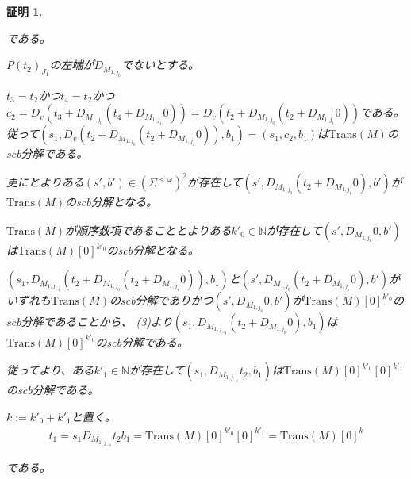 \documentclass[dvipdfmx,uplatex]{jsarticle}
\theoremstyle{customnonumberbreakfortheorem}
\theoremstyle{customnonumberbreakforproof}
\newtheorem{hideableproof}{証明}
\begin{document}
\begin{hideableproof}
\begin{indented}
\begin{indented}
\begin{indented}
\begin{indented}
\begin{indented}
						\item である。
					\end{indented}
					\item \(P(t_2)_{J_1}\)の左端が\(D_{M_{1,j_0}}\)でないとする。
					\begin{indented}
						\item \(t_3 = t_2\)かつ\(t_4 = t_2\)かつ\(c_2 = D_v(t_3 + D_{M_{1,j_0}}(t_4 + D_{M_{1,j_1}} 0)) = D_v(t_2 + D_{M_{1,j_0}}(t_2 + D_{M_{1,j_1}} 0))\)である。従って\((s_1,D_v(t_2 + D_{M_{1,j_0}}(t_2 + D_{M_{1,j_1}} 0)),b_1) = (s_1,c_2,b_1)\)は\(\textrm{Trans}(M)\)のscb分解である。
						\item 更にとよりある\((s',b') \in (\Sigma^{< \omega})^2\)が存在して\((s',D_{M_{1,j_0}}(t_2 + D_{M_{1,j_1}} 0),b')\)が\(\textrm{Trans}(M)\)のscb分解となる。
						\item \(\textrm{Trans}(M)\)が順序数項であることとよりある\(k'_0 \in \mathbb{N}\)が存在して\((s',D_{M_{1,j_0}} 0,b')\)は\(\textrm{Trans}(M)[0]^{k'_0}\)のscb分解となる。
						\item \((s_1,D_{M_{1,j_{-1}}}(t_2 + D_{M_{1,j_0}}(t_2 + D_{M_{1,j_1}} 0)),b_1)\)と\((s',D_{M_{1,j_0}}(t_2 + D_{M_{1,j_1}} 0),b')\)がいずれも\(\textrm{Trans}(M)\)のscb分解でありかつ\((s',D_{M_{1,j_0}} 0,b')\)が\(\textrm{Trans}(M)[0]^{k'_0}\)のscb分解であることから、 (3)より\((s_1,D_{M_{1,j_{-1}}}(t_2 + D_{M_{1,j_0}} 0),b_1)\)は\(\textrm{Trans}(M)[0]^{k'_0}\)のscb分解である。
						\item 従ってより、ある\(k'_1 \in \mathbb{N}\)が存在して\((s_1,D_{M_{1,j_{-1}}} t_2,b_1)\)は\(\textrm{Trans}(M)[0]^{k'_0}[0]^{k'_1}\)のscb分解である。
						\item \(k := k'_0 + k'_1\)と置く。
						\begin{eqnarray*}
						t_1 = s_1 D_{M_{1,j_{-1}}} t_2 b_1 = \textrm{Trans}(M)[0]^{k'_0}[0]^{k'_1} = \textrm{Trans}(M)[0]^k
						\end{eqnarray*}
						\item である。
					\end{indented}
				\end{indented}
			\end{indented}
		\end{indented}
	\end{indented}
\end{hideableproof}
\end{document}
